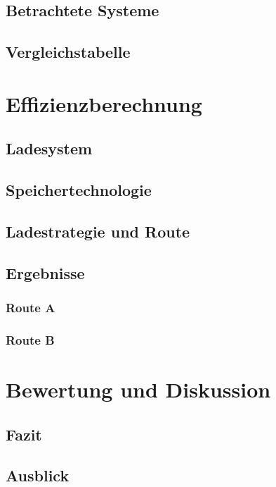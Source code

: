 \documentclass[twoside]{scrreprt}
\begin{document}
\section{Betrachtete Systeme} %
\section{Vergleichstabelle}   %

\chapter{Effizienzberechnung} %
\section{Ladesystem}
\section{Speichertechnologie}
\section{Ladestrategie und Route}
\section{Ergebnisse}
\subsection{Route A}
\subsection{Route B}

\chapter{Bewertung und Diskussion} %
\section{Fazit}
\section{Ausblick}




 
\end{document}
